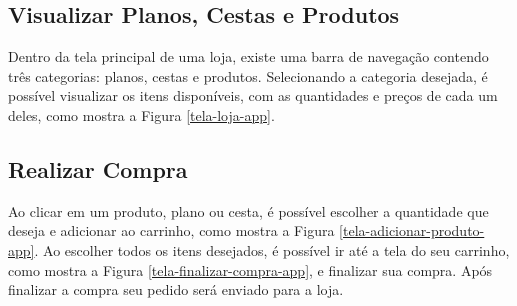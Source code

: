 \subsection{Visualizar Planos, Cestas e Produtos}
Dentro da tela principal de uma loja, existe uma barra de navegação contendo três categorias: planos, cestas e produtos. Selecionando a categoria desejada, é possível visualizar os itens disponíveis, com as quantidades e preços de cada um deles, como mostra a Figura \ref{tela-loja-app}.

\subsection{Realizar Compra}
Ao clicar em um produto, plano ou cesta, é possível escolher a quantidade que deseja e adicionar ao carrinho, como mostra a Figura \ref{tela-adicionar-produto-app}. Ao escolher todos os itens desejados, é possível ir até a tela do seu carrinho, como mostra a Figura \ref{tela-finalizar-compra-app}, e finalizar sua compra. Após finalizar a compra seu pedido será enviado para a loja.

